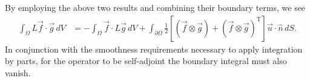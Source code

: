 \documentclass[letterpaper,reqno,11pt]{amsart}
\begin{document}
By employing the above two results and combining their boundary terms, we see
\begin{align}
  \int_{\Omega} L\vec{f}\cdot\vec{g}\,d\!V
  &=
  - \int_{\Omega} \vec{f}\cdot{}L\vec{g} \,d\!V
  + \int_{\partial\Omega} \frac{1}{2}\left[
        \left(\vec{f}\otimes\vec{g}\right)
      + \left(\vec{f}\otimes\vec{g}\right)^{\mathrm{T}} %
    \right] \vec{u}\cdot\hat{n} \,d\!S
  .
\end{align}
In conjunction with the smoothness requirements necessary to apply integration by parts,
for the operator to be self-adjoint the boundary integral must also vanish.
\end{document}
